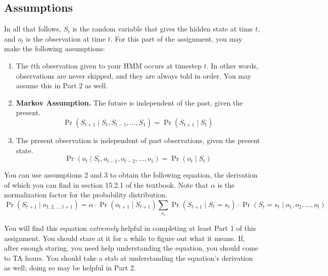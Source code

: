 \documentclass{article}
\begin{document}
\subsection{Assumptions}
In all that follows, $S_t$ is the random variable that gives the hidden state at time $t$, and $o_t$ is the observation at time $t$.
For this part of the assignment, you may make the following assumptions:
\begin{enumerate}
    \item The $t$th observation given to your HMM occurs at timestep $t$. In other words, observations are never skipped, and they are always told in order. You may assume this in Part 2 as well.

    \item \textbf{Markov Assumption.} The future is independent of the past, given the present. \[\Pr(S_{t + 1} \mid S_t, S_{t - 1}, \ldots, S_1) = \Pr(S_{t + 1} \mid S_t)\]

    \item The present observation is independent of past observations, given the present state.
    \[\Pr(o_{t} \mid S_{t}, o_{t - 1}, o_{t - 2}, \ldots, o_1) = \Pr(o_{t} \mid S_{t})\]
\end{enumerate}

You can use assumptions 2 and 3 to obtain the following equation, the derivation of which you can find in section 15.2.1 of the textbook. Note that $\alpha$ is the normalization factor for the probability distribution.
\begin{equation}
    \Pr(S_{t + 1} \mid o_{1, 2, \dots, t + 1}) = \alpha \cdot \Pr(o_{t + 1} \mid S_{t + 1}) \sum_{s_t} \Pr(S_{t + 1} \mid S_t = s_t) \cdot \Pr(S_t = s_t \mid o_1, o_2, \ldots, o_t)
\end{equation}

You will find this equation \textit{extremely} helpful in completing at least Part 1 of this assignment. You should stare at it for a while to figure out what it means. If, after enough staring, you need help understanding the equation, you should come to TA hours. You should take a stab at understanding the equation's derivation as well; doing so may be helpful in Part 2.
\end{document}

